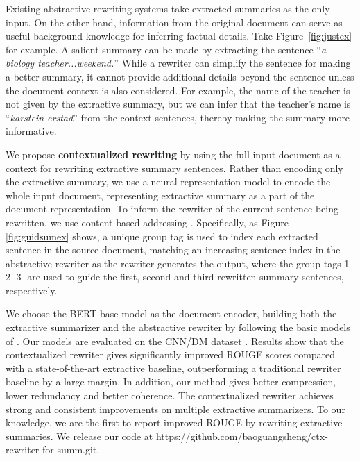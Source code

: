 \documentclass[letterpaper]{article} %
\begin{document}
Existing abstractive rewriting systems take extracted summaries as the only input. On the other hand, information from the original document can serve as useful background knowledge for inferring factual details. Take Figure~\ref{fig:justex} for example. A salient summary can be made by extracting the sentence ``{\it a biology teacher...weekend.}'' While a rewriter can simplify the sentence for making a better summary, it cannot provide additional details beyond the sentence unless the document context is also considered. For example, the name of the teacher is not given by the extractive summary, but we can infer that the teacher's name is ``{\it karstein erstad}'' from the context sentences, thereby making the summary more informative.

We propose {\bf contextualized rewriting} by using the full input document as a context for rewriting extractive summary sentences. Rather than encoding only the extractive summary, we use a neural representation model to encode the whole input document, representing extractive summary as a part of the document representation. To inform the rewriter of the current sentence being rewritten, we use content-based addressing \cite{Graves2014}. Specifically, as Figure \ref{fig:guidsumex} shows, a unique group tag is used to index each extracted sentence in the source document, matching an increasing sentence index in the abstractive rewriter as the rewriter generates the output, where the group tags \textcircled{\scriptsize 1} \textcircled{\scriptsize 2} \textcircled{\scriptsize 3} are used to guide the first, second and third rewritten summary sentences, respectively.


We choose the BERT \cite{Devlin2019} base model as the document encoder, building both the extractive summarizer and the abstractive rewriter by following the basic models of \citet{Liu2019}. Our models are evaluated on the CNN/DM dataset \cite{Hermann2015}. 
Results show that the contextualized rewriter gives significantly improved ROUGE \cite{Lin2004} scores compared with a state-of-the-art extractive baseline, outperforming a traditional rewriter baseline by a large margin. In addition, our method gives better compression, lower redundancy and better coherence. The contextualized rewriter achieves strong and consistent improvements on multiple extractive summarizers. To our knowledge, we are the first to report improved ROUGE by rewriting extractive summaries. We release our code at https://github.com/baoguangsheng/ctx-rewriter-for-summ.git.
\end{document}
